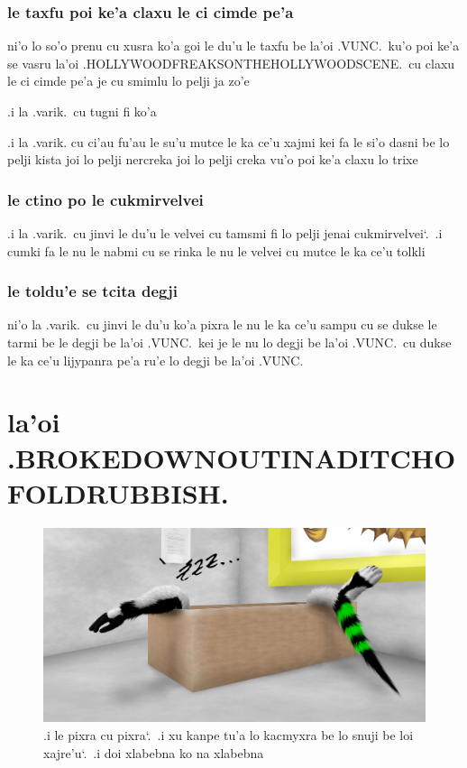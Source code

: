 \documentclass{report}
\newcommand\sds{\spacefactor\sfcode`.\ \space}
\begin{document}
\subsection{le taxfu poi ke'a claxu le ci cimde pe'a}
ni'o lo so'o prenu cu xusra ko'a goi le du'u le taxfu be la'oi .VUNC.\ ku'o poi ke'a se vasru la'oi .HOLLYWOODFREAKSONTHEHOLLYWOODSCENE.\ cu claxu le ci cimde pe'a je cu smimlu lo pelji ja zo'e

.i la .varik.\ cu tugni fi ko'a

.i la .varik. cu ci'au fu'au le su'u mutce le ka ce'u xajmi kei fa le si'o dasni be lo pelji kista joi lo pelji nercreka joi lo pelji creka vu'o poi ke'a claxu lo trixe

\subsection{le ctino po le cukmirvelvei}
.i la .varik.\ cu jinvi le du'u le velvei cu tamsmi fi lo pelji jenai cukmirvelvei\sds  .i cumki fa le nu le nabmi cu se rinka le nu le velvei cu mutce le ka ce'u tolkli

\subsection{le toldu'e se tcita degji}
ni'o la .varik.\ cu jinvi le du'u ko'a pixra le nu le ka ce'u sampu cu se dukse le tarmi be le degji be la'oi .VUNC.\ kei je le nu lo degji be la'oi .VUNC.\ cu dukse le ka ce'u lijypanra pe'a ru'e lo degji be la'oi .VUNC.

\chapter{la'oi .BROKEDOWNOUTINADITCHOFOLDRUBBISH.}
\begin{figure}[ht]
	\centering
	\includegraphics[width=\textwidth]{brokedownoutinaditchofoldrubbish/brokedownoutinaditchofoldrubbish.png}
	\caption[center]{.i le pixra cu pixra\sds  .i xu kanpe tu'a lo kacmyxra be lo snuji be loi xajre'u\sds  .i doi xlabebna ko na xlabebna}
\end{figure}
\end{document}
